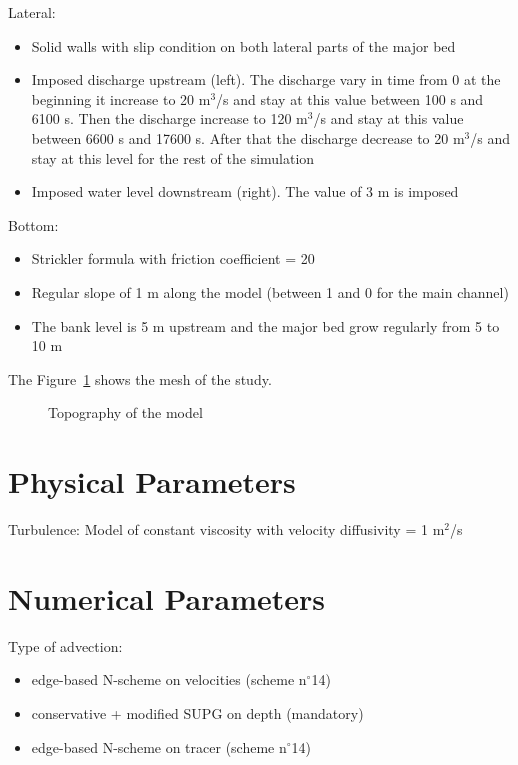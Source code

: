 Lateral:

\begin{itemize}
\item  Solid walls with slip condition on both lateral parts of the major bed
\item  Imposed discharge upstream (left). The discharge vary in time from 0 at the beginning
 it increase to 20 m${}^{3}$/s and stay at this value between 100 s and 6100 s. Then the
 discharge increase to 120 m${}^{3}$/s and stay at this value between 6600 s and 17600 s. 
 After that the discharge decrease to 20 m${}^{3}$/s and stay at this level for the 
 rest of the simulation
\item  Imposed water level downstream (right). The value of 3 m is imposed
\end{itemize}

Bottom:

\begin{itemize}
\item  Strickler formula with friction coefficient = 20
\item  Regular slope of 1 m along the model (between 1 and 0 for the main channel)
\item  The bank level is 5 m upstream and the major bed grow regularly from 5 to 10 m
\end{itemize}

The Figure~\ref{fig:bridge:bathy} shows the mesh of the study.
\begin{figure}
\centering
{}
\caption{Topography of the model}\label{fig:bridge:bathy}
\end{figure}

\section{Physical Parameters}

Turbulence: Model of constant viscosity with velocity diffusivity = 1 m${}^{2}$/s

\section{Numerical Parameters}

Type of advection:
\begin{itemize}
\item  edge-based N-scheme on velocities (scheme n$\mathrm{{}^\circ}$14)
\item  conservative + modified SUPG on depth (mandatory)
\item  edge-based N-scheme on tracer (scheme n$\mathrm{{}^\circ}$14)
\end{itemize}

